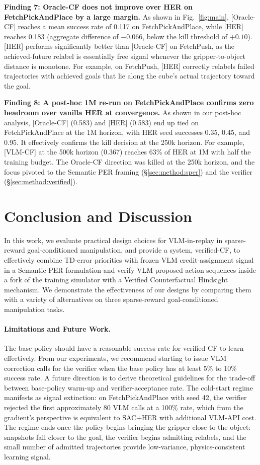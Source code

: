 \documentclass{article}
\begin{document}
\textbf{Finding 7: Oracle-CF does not improve over HER on
FetchPickAndPlace by a large margin.}
As shown in Fig.~\ref{fig:main}, [Oracle-CF] reaches a mean success
rate of 0.117 on FetchPickAndPlace, while [HER] reaches 0.183
(aggregate difference of $-0.066$, below the kill threshold of
$+0.10$). [HER] performs significantly better than [Oracle-CF] on
FetchPush, as the achieved-future relabel is essentially free
signal whenever the gripper-to-object distance is monotone. For
example, on FetchPush, [HER] correctly relabels failed trajectories
with achieved goals that lie along the cube's actual trajectory
toward the goal.

\textbf{Finding 8: A post-hoc 1M re-run on FetchPickAndPlace
confirms zero headroom over vanilla HER at convergence.}
As shown in our post-hoc analysis, [Oracle-CF] (0.583) and [HER]
(0.583) end up tied on FetchPickAndPlace at the 1M horizon, with
HER seed successes 0.35, 0.45, and 0.95. It effectively confirms
the kill decision at the 250k horizon. For example, [VLM-CF] at the
500k horizon (0.367) reaches 63\% of HER at 1M with half the
training budget. The Oracle-CF direction was killed at the 250k
horizon, and the focus pivoted to the Semantic PER framing
(\S\ref{sec:method:sper}) and the verifier
(\S\ref{sec:method:verified}).

\section{Conclusion and Discussion}
\label{sec:discussion}

In this work, we evaluate practical design choices for
VLM-in-replay in sparse-reward goal-conditioned manipulation, and
provide a system, verified-CF, to effectively combine TD-error
priorities with frozen VLM credit-assignment signal in a Semantic
PER formulation and verify VLM-proposed action sequences inside a
fork of the training simulator with a Verified Counterfactual
Hindsight mechanism. We demonstrate the effectiveness of our
designs by comparing them with a variety of alternatives on three
sparse-reward goal-conditioned manipulation tasks.

\paragraph{Limitations and Future Work.}

The base policy should have a reasonable success rate for
verified-CF to learn effectively. From our experiments, we
recommend starting to issue VLM correction calls for the verifier
when the base policy has at least 5\% to 10\% success rate. A
future direction is to derive theoretical guidelines for the
trade-off between base-policy warm-up and verifier-acceptance
rate. The cold-start regime manifests as signal extinction: on
FetchPickAndPlace with seed 42, the verifier rejected the first
approximately 80 VLM calls at a 100\% rate, which from the
gradient's perspective is equivalent to SAC+HER with additional
VLM-API cost. The regime ends once the policy begins bringing the
gripper close to the object: snapshots fall closer to the goal,
the verifier begins admitting relabels, and the small number of
admitted trajectories provide low-variance, physics-consistent
learning signal.
\end{document}
